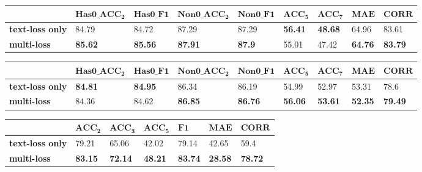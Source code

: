 \documentclass[11pt]{article}
\begin{document}
\begin{table*}
\centering
\begin{subtable}{\textwidth}
\centering
\small
\setlength{\tabcolsep}{3pt}
\renewcommand{\arraystretch}{1.2}
\begin{tabular}{lllllllll}
\hline
 & $\mathbf{Has0\_ACC_2}$ & $\mathbf{Has0\_F1}$ & $\mathbf{Non0\_ACC_2}$ & $\mathbf{Non0\_F1}$ & $\mathbf{ACC_5}$ & $\mathbf{ACC_7}$ & $\mathbf{MAE}$ & $\mathbf{CORR}$ \\ \hline
\textbf{text-loss only} & 84.79 & 84.72 & 87.29 & 87.29 & \textbf{56.41} & \textbf{48.68} & 64.96 & 83.61 \\ \hline
\textbf{multi-loss} & \textbf{85.62} & \textbf{85.56} & \textbf{87.91} & \textbf{87.9} & 55.01 & 47.42 & \textbf{64.76} & \textbf{83.79} \\ \hline
\end{tabular}
\caption{CMU-MOSI}
\label{tab:CMU-MOSI3}
\end{subtable}
\vspace{0.3cm}
\begin{subtable}{\textwidth}
\centering
\small
\setlength{\tabcolsep}{3pt}
\renewcommand{\arraystretch}{1.2}
\begin{tabular}{lllllllll}
\hline
 & $\mathbf{Has0\_ACC_2}$ & $\mathbf{Has0\_F1}$ & $\mathbf{Non0\_ACC_2}$ & $\mathbf{Non0\_F1}$ & $\mathbf{ACC_5}$ & $\mathbf{ACC_7}$ & $\mathbf{MAE}$ & $\mathbf{CORR}$ \\ \hline
\textbf{text-loss only} & \textbf{84.81} & \textbf{84.95} & 86.34 & 86.19 & 54.99 & 52.97 & 53.31 & 78.6 \\ \hline
\textbf{multi-loss} & 84.36 & 84.62 & \textbf{86.85} & \textbf{86.76} & \textbf{56.06} & \textbf{53.61} & \textbf{52.35} & \textbf{79.49} \\ \hline
\end{tabular}
\caption{CMU-MOSEI}
\label{tab:CMU-MOSEI4}
\end{subtable}
\vspace{0.3cm}
\begin{subtable}{\textwidth}
\centering
\small
\setlength{\tabcolsep}{3pt}
\renewcommand{\arraystretch}{1.2}
\begin{tabular}{lllllll}
\hline
 & $\mathbf{ACC_2}$ & $\mathbf{ACC_3}$ & $\mathbf{ACC_5}$ & $\mathbf{F1}$ & $\mathbf{MAE}$ & $\mathbf{CORR}$ \\ \hline
\textbf{text-loss only} & 79.21 & 65.06 & 42.02 & 79.14 & 42.65 & 59.4 \\ \hline
\textbf{multi-loss} & \textbf{83.15} & \textbf{72.14} & \textbf{48.21} & \textbf{83.74} & \textbf{28.58} & \textbf{78.72} \\ \hline
\end{tabular}
\caption{CH-SIMS}
\label{tab:CH-SIMS4}
\end{subtable}
\caption{\textbf{Impact of Multi-Loss on Text Subnet}: Utilizing audio-related losses can enhance performance of the text subnet, even when identical labels are employed, as is the case with CMU-MOSEI. Remarkably, using specific labels for different modalities results in a substantial performance boost in the text subnet, as evidenced by the results from CH-SIMS.}
\label{tab:Performance5}
\end{table*}
\end{document}

